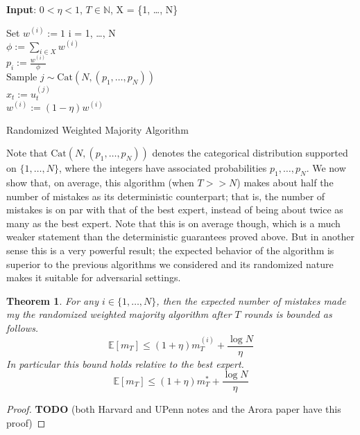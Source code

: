 \documentclass[12pt]{article}
\newcommand{\E}{\mathbb{E}}
\newtheorem{thm}{Theorem}
\begin{document}
 \begin{algorithm}[H]
	\SetAlgoLined
	
	\textbf{Input}: $0 < \eta < 1$, $T \in \mathbb{N}$,  X = \{1, \dots, N\} \\
	
	\bigskip
	
	Set $w^{(i)} := 1$  i = 1, \dots, N \\
	
	 {
		$\phi := \sum_{i \in X} w^{(i)}$ \\
		$p_i := \frac{w^{(i)}}{\phi}$ \\
		$\text{Sample } j \sim \text{Cat}(N, (p_1, \dots, p_N))$ \\
		$x_t := u_t^{(j)}$ \\
		
		 {
			 {
					$w^{(i)} := (1 - \eta)w^{(i)}$ \\
			}
		}
	}			
\caption{Randomized Weighted Majority Algorithm}
\end{algorithm}

\bigskip

Note that $\text{Cat}(N, (p_1, \dots, p_N))$ denotes the categorical distribution supported on $\{1, \dots, N\}$, where the integers have associated probabilities $p_1, \dots, p_N$. 
We now show that, on average, this algorithm (when $T >> N$) makes about half the number of mistakes as its deterministic counterpart; that is, the number of mistakes is on par
with that of the best expert, instead of being about twice as many as the best expert. Note that this is on average though, which is a much weaker statement than the deterministic 
guarantees proved above. But in another sense this is a very powerful result; the expected behavior of the algorithm is superior to the previous algorithms we considered and its 
randomized nature makes it suitable for adversarial settings. 

\begin{thm}
For any $i \in \{1, \dots, N\}$, then the expected number of mistakes made my the randomized weighted majority algorithm after $T$ rounds is bounded as follows.
\[\E[m_T] \leq (1 + \eta)m_T^{(i)} + \frac{\log N}{\eta}\]
In particular this bound holds relative to the best expert. 
\[\E[m_T] \leq (1 + \eta)m_T^{*} + \frac{\log N}{\eta}\]
\end{thm}

\begin{proof}
\textbf{TODO} (both Harvard and UPenn notes and the Arora paper have this proof)
\end{proof}
\end{document}
